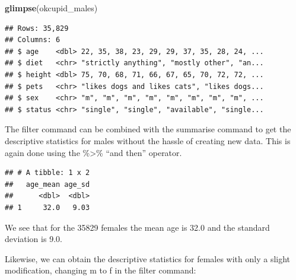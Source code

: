 \documentclass[
]{krantz}
\makeatletter
\newenvironment{Shaded}{\begin{snugshade}}{\end{snugshade}}
\newcommand{\DataTypeTok}[1]{\textcolor[rgb]{0.27,0.27,0.27}{#1}}
\newcommand{\KeywordTok}[1]{\textcolor[rgb]{0.27,0.27,0.27}{\textbf{#1}}}
\newcommand{\NormalTok}[1]{#1}
\newcommand{\OperatorTok}[1]{\textcolor[rgb]{0.43,0.43,0.43}{\textbf{#1}}}
\newcommand{\OtherTok}[1]{\textcolor[rgb]{0.37,0.37,0.37}{#1}}
\newcommand{\StringTok}[1]{\textcolor[rgb]{0.5,0.5,0.5}{#1}}
\newenvironment{kframe}{%
\medskip{}
\setlength{\fboxsep}{.8em}
 \def\at@end@of@kframe{}%
 \ifinner\ifhmode%
  \def\at@end@of@kframe{\end{minipage}}%
  \begin{minipage}{\columnwidth}%
 \fi\fi%
 \def\FrameCommand##1{\hskip\@totalleftmargin \hskip-\fboxsep
 \colorbox{shadecolor}{##1}\hskip-\fboxsep
     \hskip-\linewidth \hskip-\@totalleftmargin \hskip\columnwidth}%
 \MakeFramed {\advance\hsize-\width
   \@totalleftmargin\z@ \linewidth\hsize
   \@setminipage}}%
 {\par\unskip\endMakeFramed%
 \at@end@of@kframe}
\renewenvironment{Shaded}{\begin{kframe}}{\end{kframe}}
\makeatother
\begin{document}
\begin{Shaded}
\begin{Highlighting}[]
\KeywordTok{glimpse}\NormalTok{(okcupid_males)}
\end{Highlighting}
\end{Shaded}

\begin{verbatim}
## Rows: 35,829
## Columns: 6
## $ age    <dbl> 22, 35, 38, 23, 29, 29, 37, 35, 28, 24, ...
## $ diet   <chr> "strictly anything", "mostly other", "an...
## $ height <dbl> 75, 70, 68, 71, 66, 67, 65, 70, 72, 72, ...
## $ pets   <chr> "likes dogs and likes cats", "likes dogs...
## $ sex    <chr> "m", "m", "m", "m", "m", "m", "m", "m", ...
## $ status <chr> "single", "single", "available", "single...
\end{verbatim}

The filter command can be combined with the summarise command to get the descriptive statistics for males without the hassle of creating new data. This is again done using the \%\textgreater\% ``and then'' operator.

\begin{Shaded}
\end{Shaded}

\begin{verbatim}
## # A tibble: 1 x 2
##   age_mean age_sd
##      <dbl>  <dbl>
## 1     32.0   9.03
\end{verbatim}

We see that for the 35829 females the mean age is 32.0 and the standard deviation is 9.0.

Likewise, we can obtain the descriptive statistics for females with only a slight modification, changing m to f in the filter command:

\begin{Shaded}
\end{Shaded}
\end{document}
